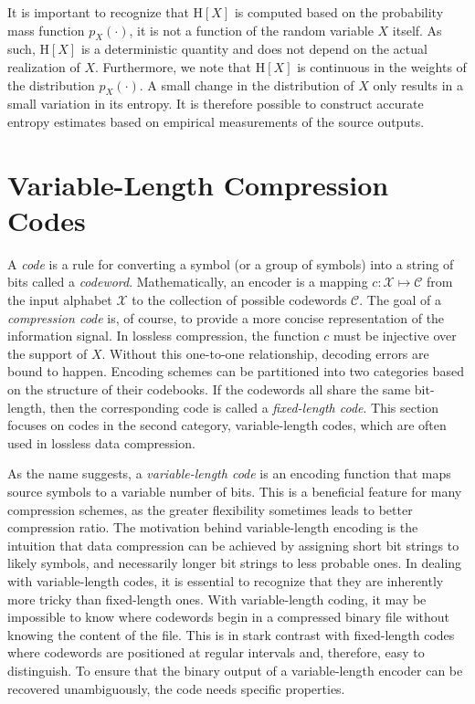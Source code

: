 It is important to recognize that $\mathrm{H}[X]$ is computed based on the probability mass function $p_X(\cdot)$, it is not a function of the random variable $X$ itself.
As such, $\mathrm{H}[X]$ is a deterministic quantity and does not depend on the actual realization of $X$.
Furthermore, we note that $\mathrm{H}[X]$ is continuous in the weights of the distribution $p_X(\cdot)$.
A small change in the distribution of $X$ only results in a small variation in its entropy.
It is therefore possible to construct accurate entropy estimates based on empirical measurements of the source outputs.


\section{Variable-Length Compression Codes}

A \emph{code} is a rule for converting a symbol (or a group of symbols) into a string of bits called a \emph{codeword}.
Mathematically, an encoder is a mapping $c : \mathcal{X} \mapsto \mathcal{C}$ from the input alphabet $\mathcal{X}$ to the collection of possible codewords $\mathcal{C}$.
The goal of a \emph{compression code} is, of course, to provide a more concise representation of the information signal.
In lossless compression, the function $c$ must be injective over the support of $X$.
Without this one-to-one relationship, decoding errors are bound to happen.
Encoding schemes can be partitioned into two categories based on the structure of their codebooks.
If the codewords all share the same bit-length, then the corresponding code is called a \emph{fixed-length code}.
This section focuses on codes in the second category, variable-length codes, which are often used in lossless data compression.

As the name suggests, a \emph{variable-length code} is an encoding function that maps source symbols to a variable number of bits.
This is a beneficial feature for many compression schemes, as the greater flexibility sometimes leads to better compression ratio.
The motivation behind variable-length encoding is the intuition that data compression can be achieved by assigning short bit strings to likely symbols, and necessarily longer bit strings to less probable ones.
In dealing with variable-length codes, it is essential to recognize that they are inherently more tricky than fixed-length ones.
With variable-length coding, it may be impossible to know where codewords begin in a compressed binary file without knowing the content of the file.
This is in stark contrast with fixed-length codes where codewords are positioned at regular intervals and, therefore, easy to distinguish.
To ensure that the binary output of a variable-length encoder can be recovered unambiguously, the code needs specific properties.

